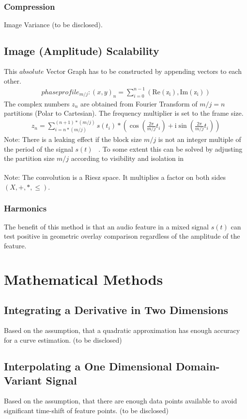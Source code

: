 \documentclass{report}
\begin{document}
\subsection{Compression}
Image Variance (to be disclosed).
\section{Image (Amplitude) Scalability}
This $absolute$ Vector Graph has to be constructed by appending vectors to each other.
\begin{align}
phaseprofile_{m/j}: (x,y)_{n}=\sum \limits _{i=0}^{n-1}(\mathrm{Re(z_{i})},\mathrm{Im(z_{i})})
\end{align}
The complex numbers $z_{n}$ are obtained from Fourier Transform of $m/j=n$ partitions (Polar to Cartesian). The frequency multiplier is set to the frame size.
\begin{align}
z_{n}= \sum \limits _{i=n*(m/j)}^{(n+1)*(m/j)} s(t_{i})*(\cos(\frac{2\pi}{m/j}t_{i})+\mathrm{i}\sin(\frac{2\pi}{m/j}t_{i}))\label{eq:3}
\end{align}
Note: There is a leaking effect if the block size $m/j$ is not an integer multiple of the period of the signal $s(t)$ ~\cite[Fensterfunktion]{Fensterfunktion}. To some extent this can be solved by adjusting the partition size $m/j$ according to visibility and isolation in ~\cite[Stopeight\_Comparator.tex]{Comparator}\\\\
Note: The convolution is a Riesz space. It multiplies a factor on both sides $(X,+,*,\leq)$.
\subsection{Harmonics}
The benefit of this method is that an audio feature in a mixed signal $s(t)$ can test positive in geometric overlay comparison regardless of the amplitude of the feature.

\chapter{Mathematical Methods}
\section{Integrating a Derivative in Two Dimensions}
Based on the assumption, that a quadratic approximation has enough accuracy for a curve estimation. (to be disclosed)
\section{Interpolating a One Dimensional Domain-Variant Signal}
Based on the assumption, that there are enough data points available to avoid significant time-shift of feature points. (to be disclosed)

\iffalse
\printbibliography
\fi
{}

\end{document}
